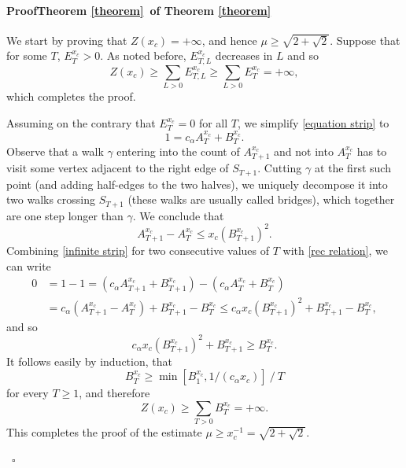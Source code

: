 \documentclass[a4paper,oneside,12pt]{article}
\newenvironment{proof}[1][\relax]%
  {\paragraph{Proof\ifx#1\relax\else~of #1\fi}}%
  {~\hfill$\square$\par\bigskip}
\begin{document}
\begin{proof}[Theorem \ref{theorem}]
We start by proving that $Z(x_c)=+\infty$, and hence $\mu\geq \sqrt{2+\sqrt 2}$. 
Suppose that for some $T$, $E^{x_c}_T>0$. As noted before, 
$E^{x_c}_{T,L}$ decreases in $L$ and so
\begin{equation*}
	Z(x_c)\geq \sum_{L>0}E^{x_c}_{T,L}\geq \sum_{L>0} E^{x_c}_T=+\infty,
\end{equation*}
which completes the proof. 

Assuming on the contrary that $E^{x_c}_T=0$ for all $T$, we simplify  \eqref{equation strip} to
\begin{equation}\label{infinite strip}
	1=c_{\alpha}A_T^{x_c}+B_T^{x_c}.
\end{equation}
Observe that a walk $\gamma$ entering into the count of $A_{T+1}^{x_c}$ 
and not into $A_T^{x_c}$ has to visit some vertex adjacent 
to the right edge of $S_{T+1}$. 
Cutting $\gamma$ at the first such point (and adding half-edges to the two halves), 
we uniquely decompose it into two walks crossing $S_{T+1}$ 
(these walks are usually called bridges), 
which together are one step longer than $\gamma$. 
We conclude that
\begin{equation}\label{rec relation}
	A_{T+1}^{x_c}-A_T^{x_c}\leq x_c\left(B_{T+1}^{x_c}\right)^2.
\end{equation}
Combining \eqref{infinite strip} for two consecutive values of $T$ with 
\eqref{rec relation}, we can write
\begin{align*}
0&=1-1=(c_{\alpha}A_{T+1}^{x_c}+B_{T+1}^{x_c})-(c_{\alpha}A_{T}^{x_c}+B_{T}^{x_c})\\
&=c_{\alpha}(A_{T+1}^{x_c}-A_T^{x_c})+B_{T+1}^{x_c}-B_T^{x_c}
\leq c_{\alpha}x_c\left(B_{T+1}^{x_c}\right)^2+B_{T+1}^{x_c}-B_T^{x_c},
\end{align*}
and so
$$c_{\alpha}x_c\left(B_{T+1}^{x_c}\right)^2+B_{T+1}^{x_c}\geq B_T^{x_c}.$$
It follows easily by induction, that
$$B_T^{x_c}\geq  {\min [B_1^{x_c},1/(c_{\alpha}x_c)]}~/~{T}$$
for every $T\geq1$, and therefore
$$Z(x_c)\geq \sum_{T>0}B_T^{x_c}=+\infty.$$
This completes the proof of the estimate $\mu\geq x_c^{-1}= \sqrt{2+\sqrt2}$.


\end{proof}
\end{document}
